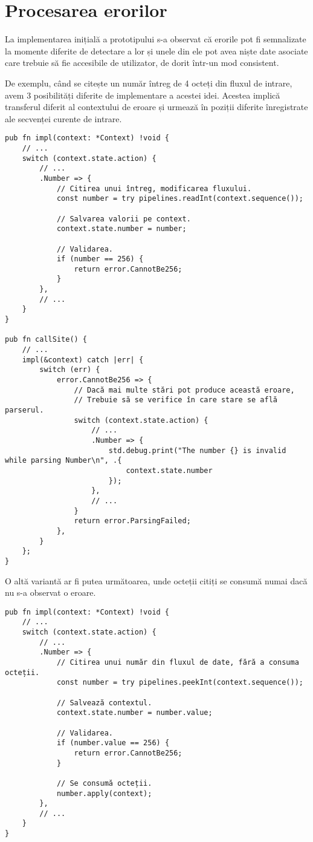 \documentclass[a4paper,12pt]{report}
\begin{document}
\section{Procesarea erorilor}

La implementarea inițială a prototipului s-a observat că erorile pot fi semnalizate
la momente diferite de detectare a lor și unele din ele pot avea niște date asociate
care trebuie să fie accesibile de utilizator, de dorit într-un mod consistent.

De exemplu, când se citește un număr întreg de 4 octeți din fluxul de intrare,
avem 3 posibilități diferite de implementare a acestei idei.
Acestea implică transferul diferit al contextului de eroare și
urmează în poziții diferite înregistrate ale secvenței curente de intrare.

\begin{verbatim}
pub fn impl(context: *Context) !void {
    // ...
    switch (context.state.action) {
        // ...
        .Number => {
            // Citirea unui întreg, modificarea fluxului.
            const number = try pipelines.readInt(context.sequence());

            // Salvarea valorii pe context.
            context.state.number = number;

            // Validarea.
            if (number == 256) {
                return error.CannotBe256;
            }
        },
        // ...
    }
}

pub fn callSite() {
    // ...
    impl(&context) catch |err| {
        switch (err) {
            error.CannotBe256 => {
                // Dacă mai multe stări pot produce această eroare,
                // Trebuie să se verifice în care stare se află parserul.
                switch (context.state.action) {
                    // ...
                    .Number => {
                        std.debug.print("The number {} is invalid while parsing Number\n", .{
                            context.state.number
                        });
                    },
                    // ...
                }
                return error.ParsingFailed;
            },
        }
    };
}
\end{verbatim}

O altă variantă ar fi putea următoarea, unde octeții citiți
se consumă numai dacă nu s-a observat o eroare.

\begin{verbatim}
pub fn impl(context: *Context) !void {
    // ...
    switch (context.state.action) {
        // ...
        .Number => {
            // Citirea unui număr din fluxul de date, fără a consuma octeții.
            const number = try pipelines.peekInt(context.sequence());

            // Salvează contextul.
            context.state.number = number.value;

            // Validarea.
            if (number.value == 256) {
                return error.CannotBe256;
            }

            // Se consumă octeții.
            number.apply(context);
        },
        // ...
    }
}
\end{verbatim}
\end{document}

